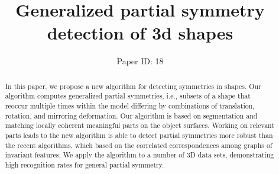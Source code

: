 \documentclass[twocolumn]{svjour3}          %
\begin{document}
\title{Generalized partial symmetry detection of 3d shapes}
\subtitle{}
\author{Paper ID: 18}
\institute{}
\date{ }%

\maketitle

\begin{abstract}
In this paper, we propose a new algorithm for detecting symmetries in shapes.
Our algorithm computes generalized partial symmetries, i.e.,
subsets of a shape that reoccur multiple times within the model differing by combinations of translation, rotation, and mirroring deformation.
Our algorithm is based on segmentation and matching locally coherent meaningful parts on the object surfaces.
Working on relevant parts leads to the new algorithm is able to detect partial symmetries more robust than the recent algorithms,
which based on the correlated correspondences among graphs of invariant features.
We apply the algorithm to a number of 3D data sets, demonstrating high recognition rates for general partial symmetry.

\end{abstract}









\end{document}
